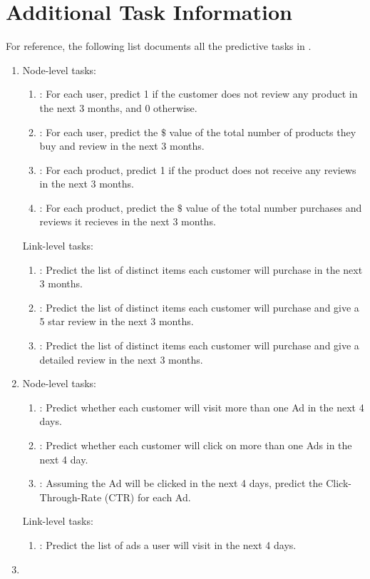 \section{Additional Task Information}
\label{app: task info}

For reference, the following list documents all the predictive tasks in \relbench.
\begin{enumerate}
\item \amazon

    Node-level tasks:
    \begin{enumerate}
    \item \userChurn: For each user, predict 1 if the customer does not review any product in the next 3 months, and 0 otherwise.
    \item \userLtv: For each user, predict the $\$$ value of the total number of products they buy and review in the next 3 months.
    \item \itemChurn: For each product, predict 1 if the  product does not receive any reviews in the next 3 months.
    \item \itemLtv: For each product, predict the $\$$ value of the total number purchases and reviews it recieves in the next 3 months.
    \end{enumerate}

    Link-level tasks:
    \begin{enumerate}
    \item \userItemPurchase: Predict the list of distinct items each customer will purchase in the
    next 3 months. 
    \item \userItemRate: Predict the list of distinct items each customer will purchase and give a 5 star review in the
    next 3 months.
    \item \userItemReview: Predict the list of distinct items each customer will purchase and give a detailed review in the
    next 3 months.
    \end{enumerate}
\item \avito

    Node-level tasks:
    \begin{enumerate}
    \item \userVisit: Predict whether each customer will visit more than one Ad in the next 4 days.
    \item \userClick: Predict whether each customer will click on more than one Ads in the next 4 day.
    \item \adsCTR: Assuming the Ad will be clicked in the next 4 days, predict the Click-Through-Rate (CTR) for each Ad.
    \end{enumerate}
    Link-level tasks:
    \begin{enumerate}
    \item \userAdVisit: Predict the list of ads a user will visit in the next 4 days.
    \end{enumerate}
\item \fone


\end{enumerate}
